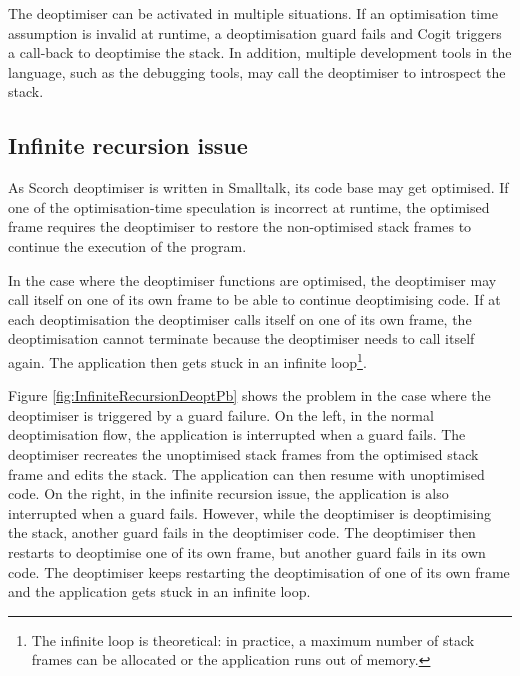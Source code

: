 \documentclass[a4paper,12pt,twoside]{../includes/ThesisStyle}
\begin{document}
The deoptimiser can be activated in multiple situations. If an optimisation time assumption is invalid at runtime, a deoptimisation guard fails and Cogit triggers a call-back to deoptimise the stack. In addition, multiple development tools in the language, such as the debugging tools, may call the deoptimiser to introspect the stack.

\subsection{Infinite recursion issue}

As Scorch deoptimiser is written in Smalltalk, its code base may get optimised. If one of the optimisation-time speculation is incorrect at runtime, the optimised frame requires the deoptimiser to restore the non-optimised stack frames to continue the execution of the program. 

In the case where the deoptimiser functions are optimised, the deoptimiser may call itself on one of its own frame to be able to continue deoptimising code. If at each deoptimisation the deoptimiser calls itself on one of its own frame, the deoptimisation cannot terminate because the deoptimiser needs to call itself again. The application then gets stuck in an infinite loop\footnote{The infinite loop is theoretical: in practice, a maximum number of stack frames can be allocated or the application runs out of memory.}.

Figure \ref{fig:InfiniteRecursionDeoptPb} shows the problem in the case where the deoptimiser is triggered by a guard failure. On the left, in the normal deoptimisation flow, the application is interrupted when a guard fails. The deoptimiser recreates the unoptimised stack frames from the optimised stack frame and edits the stack. The application can then resume with unoptimised code. On the right, in the infinite recursion issue, the application is also interrupted when a guard fails. However, while the deoptimiser is deoptimising the stack, another guard fails in the deoptimiser code. The deoptimiser then restarts to deoptimise one of its own frame, but another guard fails in its own code. The deoptimiser keeps restarting the deoptimisation of one of its own frame and the application gets stuck in an infinite loop.
\end{document}
